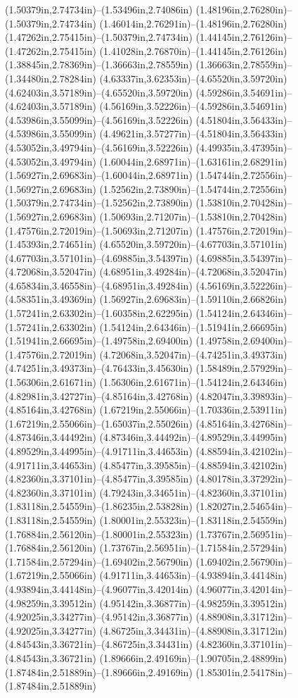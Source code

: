 (1.50379in,2.74734in)--(1.53496in,2.74086in) (1.48196in,2.76280in)--(1.50379in,2.74734in) (1.46014in,2.76291in)--(1.48196in,2.76280in) (1.47262in,2.75415in)--(1.50379in,2.74734in) (1.44145in,2.76126in)--(1.47262in,2.75415in) (1.41028in,2.76870in)--(1.44145in,2.76126in) (1.38845in,2.78369in)--(1.36663in,2.78559in) (1.36663in,2.78559in)--(1.34480in,2.78284in) (4.63337in,3.62353in)--(4.65520in,3.59720in) (4.62403in,3.57189in)--(4.65520in,3.59720in) (4.59286in,3.54691in)--(4.62403in,3.57189in) (4.56169in,3.52226in)--(4.59286in,3.54691in) (4.53986in,3.55099in)--(4.56169in,3.52226in) (4.51804in,3.56433in)--(4.53986in,3.55099in) (4.49621in,3.57277in)--(4.51804in,3.56433in) (4.53052in,3.49794in)--(4.56169in,3.52226in) (4.49935in,3.47395in)--(4.53052in,3.49794in) (1.60044in,2.68971in)--(1.63161in,2.68291in) (1.56927in,2.69683in)--(1.60044in,2.68971in) (1.54744in,2.72556in)--(1.56927in,2.69683in) (1.52562in,2.73890in)--(1.54744in,2.72556in) (1.50379in,2.74734in)--(1.52562in,2.73890in) (1.53810in,2.70428in)--(1.56927in,2.69683in) (1.50693in,2.71207in)--(1.53810in,2.70428in) (1.47576in,2.72019in)--(1.50693in,2.71207in) (1.47576in,2.72019in)--(1.45393in,2.74651in) (4.65520in,3.59720in)--(4.67703in,3.57101in) (4.67703in,3.57101in)--(4.69885in,3.54397in) (4.69885in,3.54397in)--(4.72068in,3.52047in) (4.68951in,3.49284in)--(4.72068in,3.52047in) (4.65834in,3.46558in)--(4.68951in,3.49284in) (4.56169in,3.52226in)--(4.58351in,3.49369in) (1.56927in,2.69683in)--(1.59110in,2.66826in) (1.57241in,2.63302in)--(1.60358in,2.62295in) (1.54124in,2.64346in)--(1.57241in,2.63302in) (1.54124in,2.64346in)--(1.51941in,2.66695in) (1.51941in,2.66695in)--(1.49758in,2.69400in) (1.49758in,2.69400in)--(1.47576in,2.72019in) (4.72068in,3.52047in)--(4.74251in,3.49373in) (4.74251in,3.49373in)--(4.76433in,3.45630in) (1.58489in,2.57929in)--(1.56306in,2.61671in) (1.56306in,2.61671in)--(1.54124in,2.64346in) (4.82981in,3.42727in)--(4.85164in,3.42768in) (4.82047in,3.39893in)--(4.85164in,3.42768in) (1.67219in,2.55066in)--(1.70336in,2.53911in) (1.67219in,2.55066in)--(1.65037in,2.55026in) (4.85164in,3.42768in)--(4.87346in,3.44492in) (4.87346in,3.44492in)--(4.89529in,3.44995in) (4.89529in,3.44995in)--(4.91711in,3.44653in) (4.88594in,3.42102in)--(4.91711in,3.44653in) (4.85477in,3.39585in)--(4.88594in,3.42102in) (4.82360in,3.37101in)--(4.85477in,3.39585in) (4.80178in,3.37292in)--(4.82360in,3.37101in) (4.79243in,3.34651in)--(4.82360in,3.37101in) (1.83118in,2.54559in)--(1.86235in,2.53828in) (1.82027in,2.54654in)--(1.83118in,2.54559in) (1.80001in,2.55323in)--(1.83118in,2.54559in) (1.76884in,2.56120in)--(1.80001in,2.55323in) (1.73767in,2.56951in)--(1.76884in,2.56120in) (1.73767in,2.56951in)--(1.71584in,2.57294in) (1.71584in,2.57294in)--(1.69402in,2.56790in) (1.69402in,2.56790in)--(1.67219in,2.55066in) (4.91711in,3.44653in)--(4.93894in,3.44148in) (4.93894in,3.44148in)--(4.96077in,3.42014in) (4.96077in,3.42014in)--(4.98259in,3.39512in) (4.95142in,3.36877in)--(4.98259in,3.39512in) (4.92025in,3.34277in)--(4.95142in,3.36877in) (4.88908in,3.31712in)--(4.92025in,3.34277in) (4.86725in,3.34431in)--(4.88908in,3.31712in) (4.84543in,3.36721in)--(4.86725in,3.34431in) (4.82360in,3.37101in)--(4.84543in,3.36721in) (1.89666in,2.49169in)--(1.90705in,2.48899in) (1.87484in,2.51889in)--(1.89666in,2.49169in) (1.85301in,2.54178in)--(1.87484in,2.51889in) 